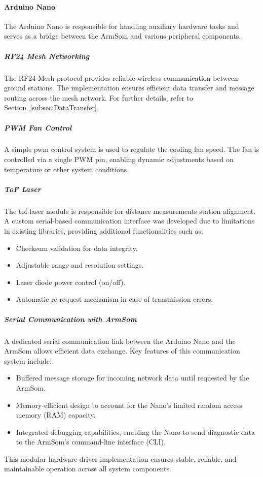 \paragraph{Arduino Nano}
The Arduino Nano is responsible for handling auxiliary hardware tasks and serves as a bridge between the ArmSom and various peripheral components.

\subparagraph{RF24 Mesh Networking}
The RF24 Mesh protocol provides reliable wireless communication between ground stations. The implementation ensures efficient data transfer and message routing across the mesh network. For further details, refer to Section~\ref{subsec:DataTransfer}.

\subparagraph{PWM Fan Control}
A simple \acrshort{pwm} control system is used to regulate the cooling fan speed. The fan is controlled via a single PWM pin, enabling dynamic adjustments based on temperature or other system conditions.

\subparagraph{ToF Laser}
The \acrshort{tof} laser module is responsible for distance measurements station alignment. A custom serial-based communication interface was developed due to limitations in existing libraries, providing additional functionalities such as:
\begin{itemize}
	\item Checksum validation for data integrity.
	\item Adjustable range and resolution settings.
	\item Laser diode power control (on/off).
	\item Automatic re-request mechanism in case of transmission errors.
\end{itemize}

\subparagraph{Serial Communication with ArmSom}
A dedicated serial communication link between the Arduino Nano and the ArmSom allows efficient data exchange. Key features of this communication system include:
\begin{itemize}
	\item Buffered message storage for incoming network data until requested by the ArmSom.
	\item Memory-efficient design to account for the Nano’s limited random access memory (RAM) capacity.
	\item Integrated debugging capabilities, enabling the Nano to send diagnostic data to the ArmSom’s command-line interface (CLI).
\end{itemize}

This modular hardware driver implementation ensures stable, reliable, and maintainable operation across all system components.

